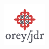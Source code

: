 \documentclass{article}
\newcommand{\mysubsection}[1]{
\vspace{0.1cm}
\noindent{\textit{\textbf{#1}}}
}
\begin{document}
\begin{multicols*}{3}

\begin{center}
\includegraphics[scale=0.5]{logo-orey}
\end{center}

\end{multicols*}
\end{document}
